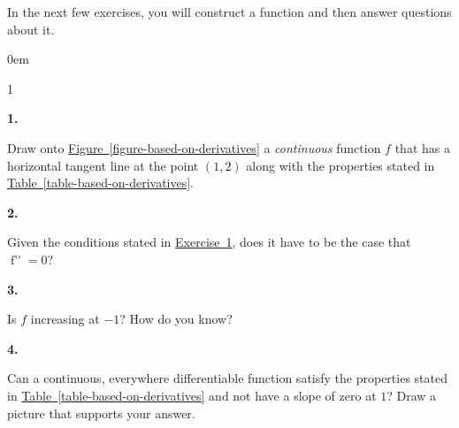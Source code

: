\documentclass[12pt,]{book}
\theoremstyle{plain}
\theoremstyle{definition}
\numberwithin{equation}{section}
\newcommand{\hrulemedium}{\noalign{\hrule height 0.07em}}
\newcommand{\hrulethick} {\noalign{\hrule height 0.11em}}
\newcounter{figstack}
\newcounter{figindex}
\newlength\fight
\newcommand\pushValignCaptionBottom[5][b]{%
\stepcounter{figstack}%
\expandafter\def\csname %
figalign\romannumeral\value{figstack}\endcsname{#1}%
\expandafter\def\csname %
figtype\romannumeral\value{figstack}\endcsname{#2}%
\expandafter\def\csname %
figwd\romannumeral\value{figstack}\endcsname{#3}%
\expandafter\def\csname %
figcontent\romannumeral\value{figstack}\endcsname{#4}%
\expandafter\def\csname %
figcap\romannumeral\value{figstack}\endcsname{#5}%
\setbox0=\hbox{%
\begin{#2}{#3}#4\end{#2}}%
\ifdim\dimexpr\ht0+\dp0\relax>\fight\global\setlength{\fight}{%
\dimexpr\ht0+\dp0\relax}\fi%
}
\newcommand\popValignCaptionBottom{%
\setcounter{figindex}{0}%
\hfill%
\whiledo{\value{figindex}<\value{figstack}}{%
\stepcounter{figindex}%
\def\tmp{\csname figwd\romannumeral\value{figindex}\endcsname}%
\begin{\csname figtype\romannumeral\value{figindex}\endcsname}[t]{\tmp}%
\centering%
\stackinset{c}{}%
{\csname figalign\romannumeral\value{figindex}\endcsname}{}%
{\csname figcontent\romannumeral\value{figindex}\endcsname}%
{\rule{0pt}{\fight}}\par%
\csname figcap\romannumeral\value{figindex}\endcsname%
\end{\csname figtype\romannumeral\value{figindex}\endcsname}%
\hfill%
}%
\setcounter{figstack}{0}%
\setlength{\fight}{0pt}%
\hfill%
}
\newenvironment{exercisegroup}%
{\medskip\noindent}%
{\par\bigskip}%
\newlength{\exercisegroupindent}%
\newlength{\exercisegroupitemwidth}%
\newenvironment{exercisegrouplist}%
{\vspace{-\partopsep}%
\begin{adjustwidth}{\exercisegroupindent}{0em}}%
{\end{adjustwidth}%
\vspace{-\partopsep}%
\vspace{\baselineskip}}%
\newenvironment{exercisegroupbycol}[1]%
{\begin{exercisegrouplist}%
\vspace{-\multicolsep}%
\begin{multicols}{#1}%
\setlength{\parindent}{0em}%
\setlength{\exercisegroupitemwidth}{\linewidth}}%
{\end{multicols}%
\vspace{-\multicolsep}%
\end{exercisegrouplist}}%
\newenvironment{exercisegroupitem}[1]%
{\begin{minipage}[t]{\exercisegroupitemwidth}
\vspace{0pt}%
{\bfseries#1}%
\rule{0pt}{\baselineskip}}{\strut%
\end{minipage}%
\hspace{\columnsep}}%
\providecommand\phantomsection{}
\newcommand{\fe}[2]{\mathop{{#1}{\left(#2\right)}}}
\newcommand{\ointerval}[2]{\left(#1,#2\right)}
\newcommand{\point}[2]{\left(#1,#2\right)}
\newcommand{\fd}[1]{#1'}
\newcommand{\sd}[1]{#1''}
\begin{document}
\begin{exercisegroup}%
In the next few exercises, you will construct a function and then answer questions about it.%
\begin{exercisegroupbycol}{1}%
\begin{exercisegroupitem}{1. }\phantomsection\hypertarget{exercise-based-on-derivatives}{\null}
Draw onto \hyperref[figure-based-on-derivatives]{Figure~\ref*{figure-based-on-derivatives}} a \emph{continuous} function \(f\) that has a horizontal tangent line at the point \(\point{1}{2}\) along with the properties stated in \hyperref[table-based-on-derivatives]{Table~\ref*{table-based-on-derivatives}}.%
\end{exercisegroupitem}%
\par%
\begin{exercisegroupitem}{2. }\phantomsection\hypertarget{exercise-203}{\null}
Given the conditions stated in \hyperref[exercise-based-on-derivatives]{Exercise~1}, does it have to be the case that \(\fe{\sd{f}}{-1}=0\)?%
\end{exercisegroupitem}%
\par%
\begin{exercisegroupitem}{3. }\phantomsection\hypertarget{exercise-204}{\null}
Is \(f\) increasing at \(-1\)?  How do you know?%
\end{exercisegroupitem}%
\par%
\begin{exercisegroupitem}{4. }\phantomsection\hypertarget{exercise-205}{\null}
Can a continuous, everywhere differentiable function satisfy the properties stated in \hyperref[table-based-on-derivatives]{Table~\ref*{table-based-on-derivatives}} and not have a slope of zero at \(1\)?  Draw a picture that supports your answer.%
\end{exercisegroupitem}%
\par%
\end{exercisegroupbycol}%
\end{exercisegroup}%
\end{document}

